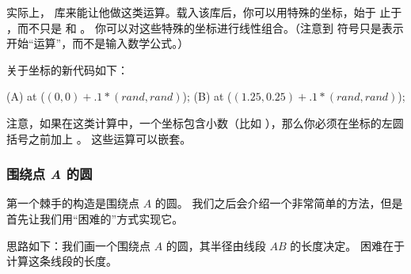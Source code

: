 实际上， 库来能让他做这类运算。载入该库后，你可以用特殊的坐标，始于 \ltz{($} 止于 \ltz{$)}，而不只是 \ltz{(} 和 \ltz{)}。
你可以对这些特殊的坐标进行线性组合。（注意到 \ltz{$} 符号只是表示开始“运算”，而不是输入数学公式。）

关于坐标的新代码如下：

\eohs

\begin{codeexample}
\coordinate [...] (A) at ($ (0,0) + .1*(rand,rand) $);
\coordinate [...] (B) at ($ (1.25,0.25) + .1*(rand,rand) $);
\end{codeexample}

\bohs

注意，如果在这类计算中，一个坐标包含小数（比如 ），那么你必须在坐标的左圆括号之前加上 \ltz{*}。
这些运算可以嵌套。

\eohs

\subsubsection{围绕点 \emph{A} 的圆}

\bohs

第一个棘手的构造是围绕点 $A$ 的圆。
我们之后会介绍一个非常简单的方法，但是首先让我们用“困难的”方式实现它。

思路如下：我们画一个围绕点 $A$ 的圆，其半径由线段 $AB$ 的长度决定。
困难在于计算这条线段的长度。

